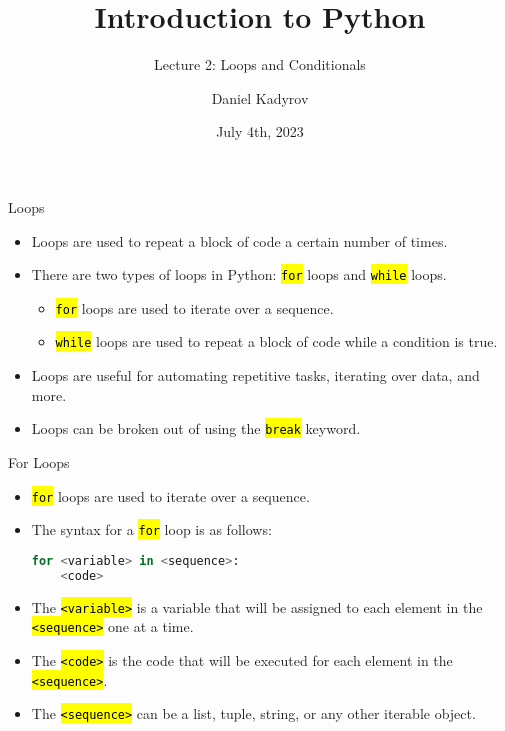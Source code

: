 \documentclass[
    aspectratio=169, 
    usepdftitle=false, 
    xcolor={dvipsnames},
    hyperref={
        colorlinks,
        linkcolor=black,
        urlcolor=blue}
    ]{beamer}
\title[Introduction to Python]{Introduction to Python}
\subtitle{Lecture 2: Loops and Conditionals}
\author{Daniel Kadyrov}
\date{July 4th, 2023}
\let\OldTexttt\texttt
\renewcommand{\texttt}[1]{\OldTexttt{\hl{#1}}}%
\begin{document}
\begin{frame}
    \titlepage
\end{frame}

\begin{frame}{Loops}
    \begin{itemize}
        \item Loops are used to repeat a block of code a certain number of times.
        \item There are two types of loops in Python: \texttt{for} loops and \texttt{while} loops.
        \begin{itemize}
            \item \texttt{for} loops are used to iterate over a sequence.
            \item \texttt{while} loops are used to repeat a block of code while a condition is true.
        \end{itemize}
        \item Loops are useful for automating repetitive tasks, iterating over data, and more.
        \item Loops can be broken out of using the \texttt{break} keyword.
    \end{itemize}
\end{frame}

\begin{frame}[fragile]{For Loops}
    \begin{itemize}
        \item \texttt{for} loops are used to iterate over a sequence.
        \item The syntax for a \texttt{for} loop is as follows:
        \begin{lstlisting}[language=Python]
for <variable> in <sequence>:
    <code>
        \end{lstlisting}
        \item The \texttt{<variable>} is a variable that will be assigned to each element in the \texttt{<sequence>} one at a time.
        \item The \texttt{<code>} is the code that will be executed for each element in the \texttt{<sequence>}.
        \item The \texttt{<sequence>} can be a list, tuple, string, or any other iterable object.
    \end{itemize}
\end{frame}
\end{document}
